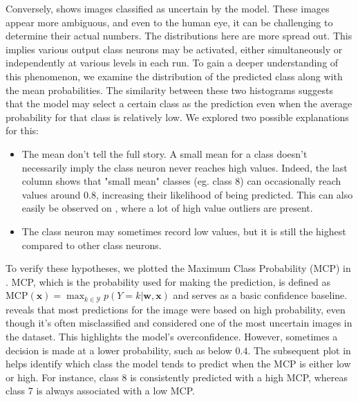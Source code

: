 Conversely,  shows images classified as uncertain by the model. These images appear more ambiguous, and even to the human eye, it can be challenging to determine their actual numbers. The distributions here are more spread out. This implies various output class neurons may be activated, either simultaneously or independently at various levels in each run. To gain a deeper understanding of this phenomenon, we examine the distribution of the predicted class along with the mean probabilities. The similarity between these two histograms suggests that the model may select a certain class as the prediction even when the average probability for that class is relatively low. We explored two possible explanations for this:
\begin{itemize}
    \item The mean don't tell the full story. A small mean for a class doesn't necessarily imply the class neuron never reaches high values. Indeed, the last column shows that "small mean" classes (eg. class 8) can occasionally reach values around $0.8$, increasing their likelihood of being predicted. This can also easily be observed on , where a lot of high value outliers are present. 
    \item The class neuron may sometimes record low values, but it is still the highest compared to other class neurons.
\end{itemize}
To verify these hypotheses, we plotted the Maximum Class Probability (MCP) in . MCP, which is the probability used for making the prediction, is defined as $ \text{MCP}(\boldsymbol{x}) = \max _{k \in \mathcal{Y}} p(Y=k | \boldsymbol{w}, \boldsymbol{x}) $ and serves as a basic confidence baseline.  reveals that most predictions for the image were based on high probability, even though it's often misclassified and considered one of the most uncertain images in the dataset. This highlights the model's overconfidence. However, sometimes a decision is made at a lower probability, such as below $ 0.4 $. The subsequent plot in  helps identify which class the model tends to predict when the MCP is either low or high. For instance, class 8 is consistently predicted with a high MCP, whereas class 7 is always associated with a low MCP.

